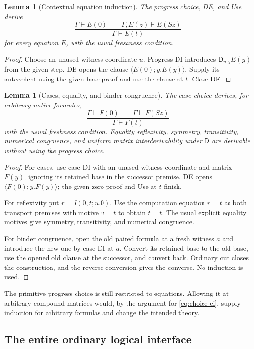 \documentclass[11pt]{article}
\newtheorem{lemma}[theorem]{Lemma}
\theoremstyle{definition}\newtheorem{definition}[theorem]{Definition}
\begin{document}
\begin{lemma}[Contextual equation induction]
\label{lem:choice-ei}
The progress choice, DE, and Use derive
\[
\frac{\Gamma\vdash E(0)\qquad
      \Gamma,E(z)\vdash E(Sz)}
     {\Gamma\vdash E(t)}
\tag{EI}\label{eq:choice-ei}
\]
for every equation $E$, with the usual freshness condition.
\end{lemma}
\begin{proof}
Choose an unused witness coordinate $u$. Progress DI introduces
$\mathsf D_{u,y}E(y)$ from the given step. DE opens the clause
$\langle E(0);y.E(y)\rangle$. Supply its antecedent using the given
base proof and use the clause at $t$. Close DE.
\end{proof}

\begin{lemma}[Cases, equality, and binder congruence]
\label{lem:choice-preinduction}
The case choice derives, for arbitrary native formulas,
\[
\frac{\Gamma\vdash F(0)\qquad\Gamma\vdash F(Sz)}
     {\Gamma\vdash F(t)}
\tag{NC}\label{eq:choice-nc}
\]
with the usual freshness condition. Equality reflexivity,
symmetry, transitivity, numerical congruence, and uniform
matrix interderivability under $\mathsf D$ are derivable
without using the progress choice.
\end{lemma}
\begin{proof}
For cases, use case DI with an unused witness coordinate and
matrix $F(y)$, ignoring its retained base in the successor
premise. DE opens $\langle F(0);y.F(y)\rangle$; the given zero
proof and Use at $t$ finish.

For reflexivity put $r=I(0,t;u.0)$. Use the computation equation
$r=t$ as both transport premises with motive $v=t$ to obtain
$t=t$. The usual explicit equality motives give symmetry,
transitivity, and numerical congruence.

For binder congruence, open the old paired formula at a fresh
witness $a$ and introduce the new one by case DI at $a$.
Convert its retained base to the old base, use the opened
old clause at the successor, and convert back. Ordinary cut
closes the construction, and the reverse conversion gives
the converse. No induction is used.
\end{proof}

The primitive progress choice is still restricted to equations.
Allowing it at arbitrary compound matrices would, by the
argument for \eqref{eq:choice-ei}, supply induction for
arbitrary formulas and change the intended theory.

\subsection{The entire ordinary logical interface}
\label{subsec:choice-logic}
\end{document}
